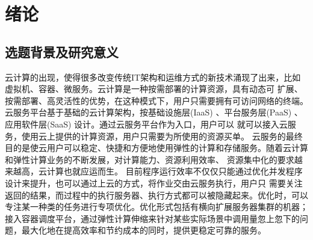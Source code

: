 
\chapter{绪论}

%



%



%
%




%
%
%

\section{选题背景及研究意义}
云计算的出现，使得很多改变传统IT架构和运维方式的新技术涌现了出来，比如虚拟机、容器、微服务。云计算是一种按需部署的计算资源，具有动态可
扩展、按需部署、高灵活性的优势，在这种模式下，用户只需要拥有可访问网络的终端。
云服务平台基于基础的云计算架构，按基础设施层(IaaS) 、平台服务层(PaaS) 、应用软件层(SaaS) 设计\cite{othe3}。通过云服务平台作为入口，用户可以
就可以接入云服务，使用云上提供的计算资源，用户只需要为所使用的资源买单。
云服务的最终目的是使云用户可以稳定、快捷和方便地使用弹性的计算和存储服务\cite{othe4}。随着云计算和弹性计算业务的不断发展，对计算能力、资源利用效率、
资源集中化的要求越来越高，云计算也就应运而生。
目前程序运行效率不仅仅只能通过优化并发程序设计来提升，也可以通过上云的方式，将作业交由云服务执行，用户只
需要关注返回的结果，而过程中的执行服务器、执行方式都可以被隐藏起来。优化时，可以专注某一种类的任务进行专项优化。优化形式包括有横向扩展服务器集群的机器；
接入容器调度平台，通过弹性计算伸缩来针对某些实际场景中调用量忽上忽下的问题，最大化地在提高效率和节约成本的同时，提供更稳定可靠的服务\cite{wfwbpyy}。

